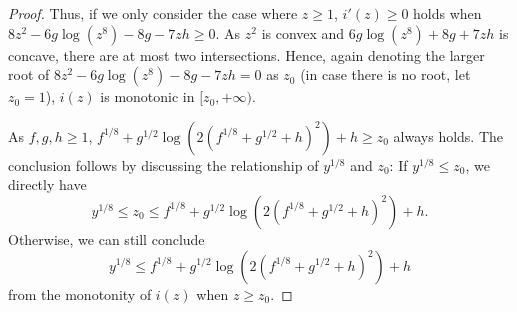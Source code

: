 \documentclass[11pt,fullpage,letterpaper]{article} %
\begin{document}
\begin{proof}
Thus, if we only consider the case where $z\ge 1$, $i'(z)\ge 0$ holds when $8z^2 - 6 g \log(z^8) - 8 g - 7z h\ge 0$.
As $z^2$ is convex and $6g\log (z^8) + 8g + 7zh$ is concave, there are at most two intersections.
Hence, again denoting the larger root of $8z^2 - 6 g \log(z^8) - 8 g - 7z h = 0$ as $z_0$ (in case there is no root, let $z_0=1$), $i(z)$ is monotonic in $[z_0,+\infty)$.

As $f,g,h\ge 1$, $f^{1/8} + g^{1/2} \log \left (2(f^{1/8}+g^{1/2}+h)^2\right ) + h \ge z_0$ always holds. The conclusion follows by discussing the relationship of $y^{1/8}$ and $z_0$: If $y^{1/8}\le z_0$, we directly have
\begin{equation*}
y^{1/8}\le z_0\le f^{1/8} + g^{1/2} \log \left (2(f^{1/8}+g^{1/2}+h)^2\right ) + h.
\end{equation*}
Otherwise, we can still conclude
\begin{equation*}
y^{1/8}\le f^{1/8} + g^{1/2} \log \left (2(f^{1/8}+g^{1/2}+h)^2\right ) + h
\end{equation*}
from the monotonity of $i(z)$ when $z\ge z_0$.
\end{proof}
\end{document}
